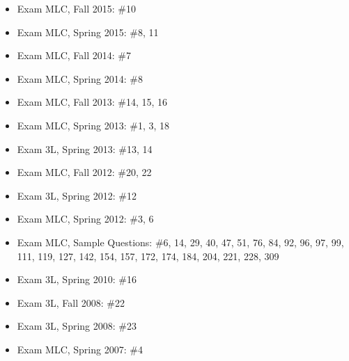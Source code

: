 \documentclass[]{book}
\begin{document}
\begin{itemize}
\item
  Exam MLC, Fall 2015: \#10
\item
  Exam MLC, Spring 2015: \#8, 11
\item
  Exam MLC, Fall 2014: \#7
\item
  Exam MLC, Spring 2014: \#8
\item
  Exam MLC, Fall 2013: \#14, 15, 16
\item
  Exam MLC, Spring 2013: \#1, 3, 18
\item
  Exam 3L, Spring 2013: \#13, 14
\item
  Exam MLC, Fall 2012: \#20, 22
\item
  Exam 3L, Spring 2012: \#12
\item
  Exam MLC, Spring 2012: \#3, 6
\item
  Exam MLC, Sample Questions: \#6, 14, 29, 40, 47, 51, 76, 84, 92, 96,
  97, 99, 111, 119, 127, 142, 154, 157, 172, 174, 184, 204, 221, 228,
  309
\item
  Exam 3L, Spring 2010: \#16
\item
  Exam 3L, Fall 2008: \#22
\item
  Exam 3L, Spring 2008: \#23
\item
  Exam MLC, Spring 2007: \#4
\end{itemize}


\end{document}
